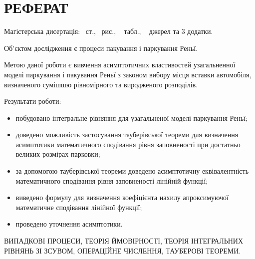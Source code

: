 \chapter*{РЕФЕРАТ}

Магістерська дисертація: \pageref*{MyLastPage}~ст., \totfig~рис., \tottab~ табл., ~ джерел та 3 додатки.

Об'єктом дослідження є процеси пакування і паркування Реньї.

Метою даної роботи є вивчення асимптотичних властивостей узагальненної моделі паркування і пакування Реньї з законом вибору місця вставки автомобіля, визначеного сумішшю рівномірного та виродженого розподілів.

Результати роботи:
\begin{itemize}
	\item побудовано інтегральне рівняння для узагальненої моделі паркування Реньї;
	\item доведено можливість застосування тауберівської теореми для визначення асимптотики математичного сподівання рівня заповненості при достатньо великих розмірах парковки;
	\item за допомогою тауберівської теореми доведено асимптотичну еквівалентність математичного сподівання рівня заповненості лінійній функції;
	\item виведено формулу для визначення коефіцієнта нахилу апроксимуючої математичне сподівання лінійної функції;
	\item проведено уточнення асимптотики.
\end{itemize}

\MakeUppercase{випадкові процеси, теорія ймовірності, теорія інтегральних рівнянь зі зсувом, операційне числення, тауберові теореми.} 
